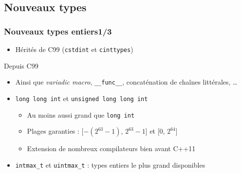 \documentclass[C++.tex]{subfiles}
\begin{document}
\subsection*{Nouveaux types}
\begin{frame}[fragile]
	\frametitle{Nouveaux types entiers\titlehfill{}1/3}
	\begin{itemize}
		\item Hérités de C99 (\lstinline[keywordstyle=\color{black}]|cstdint| et \lstinline|cinttypes|)
	\end{itemize}

	\begin{block}{Depuis C99}
	\begin{itemize}
		\item 	Ainsi que \textit{variadic macro}, \lstinline|__func__|, concaténation de chaînes littérales, \ldots
	\end{itemize}
	\end{block}

	\begin{itemize}
		\item \lstinline|long long int| et \lstinline|unsigned long long int|
		\begin{itemize}
			\item Au moins aussi grand que \lstinline|long int|
			\item Plages garanties : [$-(2^{63}-1)$, $2^{63}-1$] et [$0$, $2^{64}$]
			\item Extension de nombreux compilateurs bien avant C++11
		\end{itemize}
		\item \lstinline|intmax_t| et \lstinline|uintmax_t| : types entiers le plus grand disponibles
	\end{itemize}
\end{frame}
\end{document}
